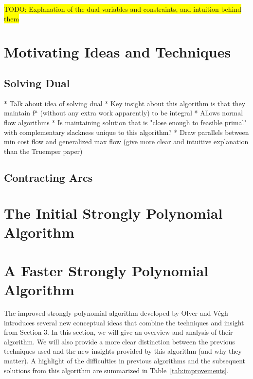 \documentclass{article}
\newcommand{\todo}[1]{\colorbox{yellow}{TODO: #1}}
\begin{document}
\todo{Explanation of the dual variables and constraints, and intuition behind them}
  
\section{Motivating Ideas and Techniques}
	\subsection{Solving Dual}
    	* Talk about idea of solving dual 
        	* Key insight about this algorithm is that they maintain f$^{\mu}$ (without any extra work apparently) to be integral
            * Allows normal flow algorithms 
            * Is maintaining solution that is "close enough to feasible primal" with complementary slackness unique to this algorithm?
            * Draw parallels between min cost flow and generalized max flow (give more clear and intuitive explanation than the Truemper paper)
    \subsection{Contracting Arcs}
    

\section{The Initial Strongly Polynomial Algorithm}
\section{A Faster Strongly Polynomial Algorithm} The improved strongly polynomial algorithm developed by Olver and Végh \cite{Olver2017} introduces several new conceptual ideas that combine the techniques and insight from Section 3. In this section, we will give an overview and analysis of their algorithm. We will also provide a more clear distinction between the previous techniques used and the new insights provided by this algorithm (and why they matter). A highlight of the difficulties in previous algorithms and the subsequent solutions from this algorithm are summarized in Table~\ref{tab:improvements}.
\end{document}
